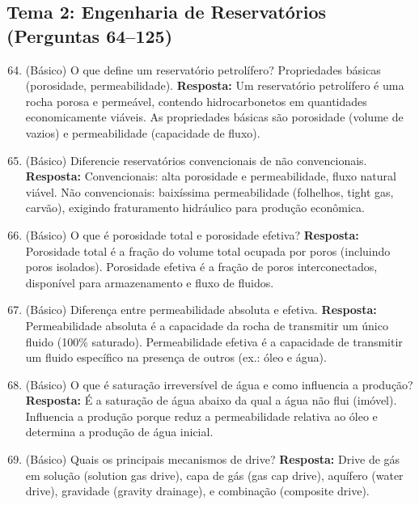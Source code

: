 \documentclass[11pt,a4paper]{article}
\begin{document}
\newpage

\subsection*{Tema 2: Engenharia de Reservatórios (Perguntas 64–125)}

\begin{enumerate}
  \setcounter{enumi}{63}
  \item (Básico) O que define um reservatório petrolífero? Propriedades básicas (porosidade, permeabilidade).
  \textbf{Resposta:} Um reservatório petrolífero é uma rocha porosa e permeável, contendo hidrocarbonetos em quantidades economicamente viáveis. As propriedades básicas são porosidade (volume de vazios) e permeabilidade (capacidade de fluxo).

  \item (Básico) Diferencie reservatórios convencionais de não convencionais.
  \textbf{Resposta:} Convencionais: alta porosidade e permeabilidade, fluxo natural viável. Não convencionais: baixíssima permeabilidade (folhelhos, tight gas, carvão), exigindo fraturamento hidráulico para produção econômica.

  \item (Básico) O que é porosidade total e porosidade efetiva?
  \textbf{Resposta:} Porosidade total é a fração do volume total ocupada por poros (incluindo poros isolados). Porosidade efetiva é a fração de poros interconectados, disponível para armazenamento e fluxo de fluidos.

  \item (Básico) Diferença entre permeabilidade absoluta e efetiva.
  \textbf{Resposta:} Permeabilidade absoluta é a capacidade da rocha de transmitir um único fluido (100\% saturado). Permeabilidade efetiva é a capacidade de transmitir um fluido específico na presença de outros (ex.: óleo e água).

  \item (Básico) O que é saturação irreversível de água e como influencia a produção?
  \textbf{Resposta:} É a saturação de água abaixo da qual a água não flui (imóvel). Influencia a produção porque reduz a permeabilidade relativa ao óleo e determina a produção de água inicial.

  \item (Básico) Quais os principais mecanismos de drive?
  \textbf{Resposta:} Drive de gás em solução (solution gas drive), capa de gás (gas cap drive), aquífero (water drive), gravidade (gravity drainage), e combinação (composite drive).


\end{enumerate}
\end{document}
